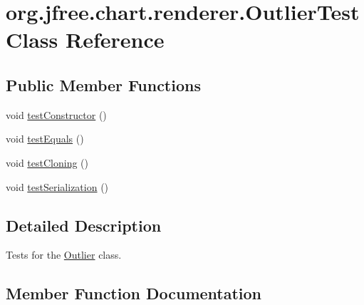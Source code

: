 \hypertarget{classorg_1_1jfree_1_1chart_1_1renderer_1_1_outlier_test}{}\section{org.\+jfree.\+chart.\+renderer.\+Outlier\+Test Class Reference}
\label{classorg_1_1jfree_1_1chart_1_1renderer_1_1_outlier_test}
\subsection*{Public Member Functions}
\begin{DoxyCompactItemize}
\item 
void \mbox{\hyperlink{classorg_1_1jfree_1_1chart_1_1renderer_1_1_outlier_test_acb63c2ddb5c6e2ca4c502ac07abaabed}{test\+Constructor}} ()
\item 
void \mbox{\hyperlink{classorg_1_1jfree_1_1chart_1_1renderer_1_1_outlier_test_a5831999a124defa8643716c653f9332e}{test\+Equals}} ()
\item 
void \mbox{\hyperlink{classorg_1_1jfree_1_1chart_1_1renderer_1_1_outlier_test_ac9d9aad8b38b11ba98104686776d9f7c}{test\+Cloning}} ()
\item 
void \mbox{\hyperlink{classorg_1_1jfree_1_1chart_1_1renderer_1_1_outlier_test_a2912dbdeb9f54b02736d2368f3317042}{test\+Serialization}} ()
\end{DoxyCompactItemize}


\subsection{Detailed Description}
Tests for the \mbox{\hyperlink{classorg_1_1jfree_1_1chart_1_1renderer_1_1_outlier}{Outlier}} class. 

\subsection{Member Function Documentation}
\mbox{\label{classorg_1_1jfree_1_1chart_1_1renderer_1_1_outlier_test_ac9d9aad8b38b11ba98104686776d9f7c}} 
